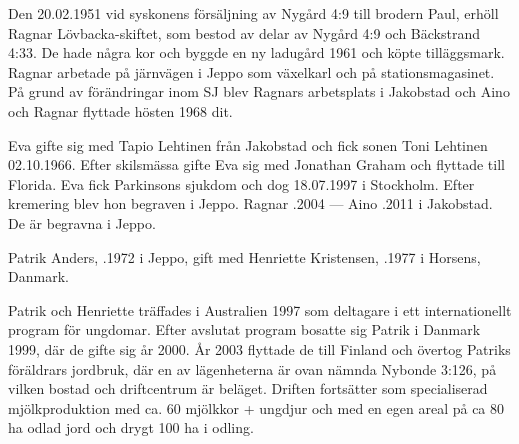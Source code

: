 Den 20.02.1951 vid syskonens försäljning av Nygård 4:9 till brodern Paul, erhöll Ragnar Lövbacka-skiftet, som bestod av delar av Nygård 4:9 och Bäckstrand 4:33. De hade några kor och byggde en ny ladugård 1961 och köpte tilläggsmark. Ragnar arbetade på järnvägen i Jeppo som växelkarl och på stationsmagasinet. På grund av förändringar inom SJ blev Ragnars arbetsplats i Jakobstad och Aino och Ragnar flyttade hösten 1968 dit.
\begin{jhchildren}
  \item {}
  \item {}
\end{jhchildren}
Eva gifte sig med Tapio Lehtinen från Jakobstad och fick sonen Toni Lehtinen 02.10.1966. Efter skilsmässa gifte Eva sig med Jonathan Graham och flyttade till Florida. Eva fick Parkinsons sjukdom och dog 18.07.1997 i Stockholm. Efter kremering blev hon begraven i Jeppo.
Ragnar .2004  ---  Aino .2011 i Jakobstad. De är begravna i Jeppo.






Patrik Anders, .1972 i Jeppo, gift med Henriette Kristensen, .1977 i Horsens, Danmark.
\begin{jhchildren}
  \item {}
  \item {}
  \item {}
  \item {}
  \item {}
\end{jhchildren}

Patrik och Henriette träffades i Australien 1997 som deltagare i ett internationellt program för ungdomar. Efter avslutat program bosatte sig Patrik i Danmark 1999, där de gifte sig år 2000. År 2003 flyttade de till Finland och övertog Patriks föräldrars jordbruk, där en av  lägenheterna är ovan nämnda Nybonde 3:126, på vilken bostad och driftcentrum är beläget. Driften fortsätter som specialiserad mjölkproduktion med ca. 60 mjölkkor + ungdjur och med en egen areal på ca 80 ha odlad jord och drygt 100 ha i odling.


